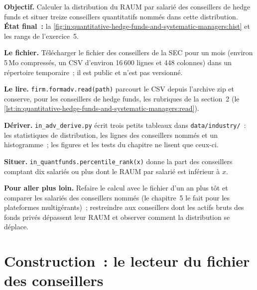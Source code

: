 \begin{tutorial}
\textbf{Objectif.} Calculer la distribution du RAUM par salarié des conseillers de hedge funds et situer treize conseillers quantitatifs
nommés dans cette distribution. \textbf{État final~:} la \cref{fig:in:quantitative-hedge-funds-and-systematic-managers:hist} et les rangs de
l'exercice~5.
\begin{tutsteps}
\item \textbf{Le fichier.} Télécharger le fichier des conseillers de la SEC pour un mois (environ 5\,Mo compressés, un CSV d'environ 16\,600 lignes
et 448 colonnes) dans un répertoire temporaire~; il est public et n'est pas versionné.
\item \textbf{Le lire.} \texttt{firm.formadv.read(path)} parcourt le CSV depuis l'archive zip et conserve, pour les conseillers de hedge
funds, les rubriques de la section~2 (le \cref{lst:in:quantitative-hedge-funds-and-systematic-managers:read}).
\label{lst:in:quantitative-hedge-funds-and-systematic-managers:read}
\item \textbf{Dériver.} \texttt{in\_adv\_derive.py} écrit trois petits tableaux dans \texttt{data/industry/}~: les
statistiques de distribution, les lignes des conseillers nommés et un histogramme~; les figures et les tests du chapitre ne lisent que ceux-ci.
\item \textbf{Situer.} \texttt{in\_quantfunds.percentile\_rank(x)} donne la part des conseillers comptant dix salariés ou plus
dont le RAUM par salarié est inférieur à $x$.
\end{tutsteps}
\end{tutorial}

\textbf{Pour aller plus loin.} Refaire le calcul avec le fichier d'un an plus tôt et comparer les salariés des conseillers nommés
(le chapitre~5 le fait pour les plateformes multigérants)~; restreindre aux conseillers dont les actifs bruts des fonds privés dépassent
leur RAUM et observer comment la distribution se déplace.

\section{Construction~: le lecteur du fichier des conseillers}\label{bld:in:quantitative-hedge-funds-and-systematic-managers:formadv}

